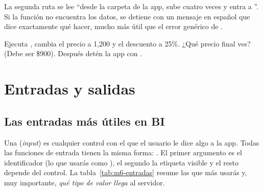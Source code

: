 La segunda ruta se lee ``desde la carpeta de la app, sube cuatro veces y
entra a ''. Si la función no encuentra los datos, se
detiene con un mensaje en español que dice exactamente qué hacer, mucho más
útil que el error genérico de .

\begin{hazlotu}
Ejecuta , cambia
el precio a 1,200 y el descuento a 25\%. ¿Qué precio final ves? (Debe ser
\$900). Después detén la app con .
\end{hazlotu}

\section{Entradas y salidas}
\label{sec:m6-entradas-salidas}

\subsection{Las entradas más útiles en BI}

Una  (\emph{input}) es cualquier control con el que el
usuario le dice algo a la app. Todas las funciones de entrada tienen la misma
forma: . El primer argumento es el
identificador (lo que usarás como ), el segundo la
etiqueta visible y el resto depende del control. La
tabla~\ref{tab:m6-entradas} resume las que más usarás y, muy importante,
\emph{qué tipo de valor llega} al servidor.

